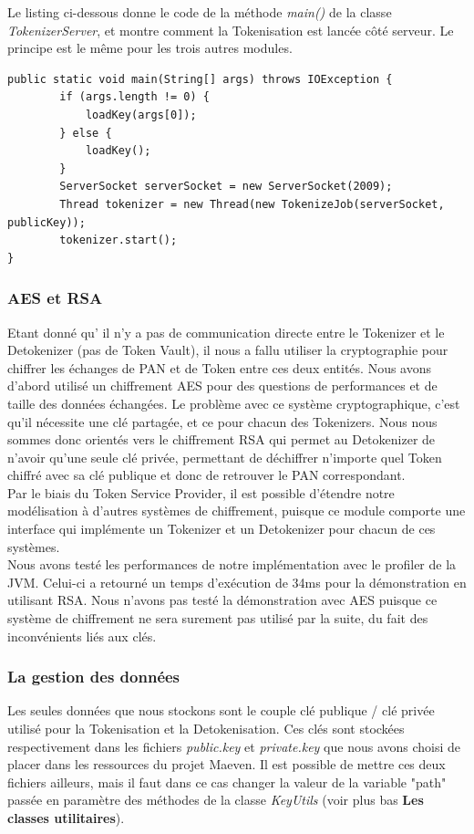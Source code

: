 \documentclass{report}
\begin{document}
\noindent
Le listing ci-dessous donne le code de la méthode \textit{main()} de la classe \textit{TokenizerServer}, et montre comment la Tokenisation est lancée côté serveur. Le principe est le même pour les trois autres modules.\\

\begin{lstlisting}
public static void main(String[] args) throws IOException {
        if (args.length != 0) {
            loadKey(args[0]);
        } else {
            loadKey();
        }
        ServerSocket serverSocket = new ServerSocket(2009);
        Thread tokenizer = new Thread(new TokenizeJob(serverSocket, publicKey));
        tokenizer.start();
}
\end{lstlisting}

\subsubsection{AES et RSA}
Etant donné qu' il n'y a pas de communication directe entre le Tokenizer et le Detokenizer (pas de Token Vault), il nous a fallu utiliser la cryptographie pour chiffrer les échanges de PAN et de Token entre ces deux entités. Nous avons d'abord utilisé un chiffrement AES pour des questions de performances et de taille des données échangées. Le problème avec ce système cryptographique, c'est qu'il nécessite une clé partagée, et ce pour chacun des Tokenizers. Nous nous sommes donc orientés vers le chiffrement RSA qui permet au Detokenizer de n'avoir qu'une seule clé privée, permettant de déchiffrer n'importe quel Token chiffré avec sa clé publique et donc de retrouver le PAN correspondant.\\
Par le biais du Token Service Provider, il est possible d'étendre notre modélisation à d'autres systèmes de chiffrement, puisque ce module comporte une interface qui implémente un Tokenizer et un Detokenizer pour chacun de ces systèmes.\\

\noindent
Nous avons testé les performances de notre implémentation avec le profiler de la JVM. Celui-ci a retourné un temps d'exécution de 34ms pour la démonstration en utilisant RSA. Nous n'avons pas testé la démonstration avec AES puisque ce système de chiffrement ne sera surement pas utilisé par la suite, du fait des inconvénients liés aux clés.

\subsubsection{La gestion des données}
Les seules données que nous stockons sont le couple clé publique / clé privée utilisé pour la Tokenisation et la Detokenisation. Ces clés sont stockées respectivement dans les fichiers \textit{public.key} et \textit{private.key} que nous avons choisi de placer dans les ressources du projet Maeven. Il est possible de mettre ces deux fichiers ailleurs, mais il faut dans ce cas changer la valeur de la variable "path" passée en paramètre des méthodes de la classe \textit{KeyUtils} (voir plus bas \textbf{Les classes utilitaires}).
\end{document}
